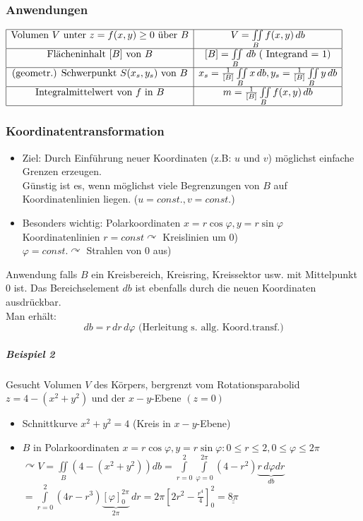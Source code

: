 \documentclass[a4paper]{scrartcl}
\begin{document}
\subsubsection{Anwendungen}
$\begin{array}{|c|c|} \hline
\text{Volumen } V \text{ unter } z=f(x,y) \geq 0 \text{ über } B & V = \iint\limits_B f(x,y) \, db\\ \hline
\text{Flächeninhalt } [B] \text{ von } B & [B] = \iint\limits_B \, db \text{ ( Integrand = 1)}\\ \hline
\text{(geometr.) Schwerpunkt } S(x_s,y_s) \text{ von } B & x_s= \frac{1}{[B]} \iint\limits_{B} x \, db , y_s= \frac{1}{[B]} \iint\limits_{B} y \, db \\ \hline
\text{Integralmittelwert von } f \text{ in } B & m = \frac{1}{[B]} \iint\limits_B f(x,y) \, db \\ \hline
\end{array}$

\subsubsection{Koordinatentransformation}
\begin{itemize}
\item Ziel: Durch Einführung neuer Koordinaten (z.B: $u$ und $v$) möglichst einfache Grenzen erzeugen.\\
Günstig ist es, wenn möglichst viele Begrenzungen von $B$ auf Koordinatenlinien liegen. ($u = const., v = const.$)
\item Besonders wichtig: Polarkoordinaten $x=r \cos{\varphi}, y = r \sin{\varphi}$\\
Koordinatenlinien $r=const \curvearrowright$ Kreislinien um 0)\\
$\varphi = const. \curvearrowright$ Strahlen von 0 aus)
\end{itemize}
Anwendung falls $B$ ein Kreisbereich, Kreisring, Kreissektor usw. mit Mittelpunkt 0 ist. Das Bereichselement $db$ ist ebenfalls durch die neuen Koordinaten ausdrückbar.\\
Man erhält: \[db=r \, dr \, d\varphi \text{ (Herleitung s. allg. Koord.transf.)}\]


\subparagraph{Beispiel 2} Gesucht Volumen $V$ des Körpers,  bergrenzt vom Rotationsparabolid $z=4-(x^2+y^2)$ und der $x-y$-Ebene $(z=0)$
\begin{itemize}
\item Schnittkurve $x^2 + y^2 = 4$ (Kreis in $x-y$-Ebene)
\item $B$ in Polarkoordinaten $x=r \cos{\varphi}, y= r \sin{\varphi}: 0 \leq r \leq 2, 0 \leq \varphi \leq 2\pi $
$\curvearrowright V = \iint\limits_B (4-(x^2+y^2))db = \int\limits_{r=0}^{2} \int\limits_{\varphi=0}^{2\pi} (4-r^2) \underbrace{r \, d\varphi dr}_{db}$\\
$=\int\limits_{r=0}^{2}(4r-r^3) \underbrace{[\varphi]_0^{2\pi}}_{2\pi} \, dr = 2\pi \left [ 2r^2 - \frac{r^4}{4} \right ]_0^2 = \underline{\underline{8\pi}}$
\end{itemize}
\end{document}
